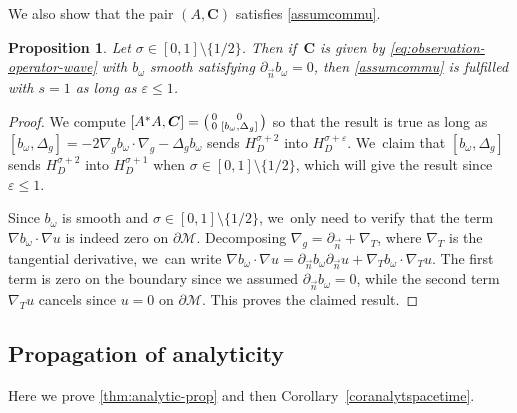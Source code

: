 \documentclass[JEP,XML,SOM,Unicode,published]{cedram}
\newtheorem{proposition}[theorem]{Proposition}
\theoremstyle{definition}
\let\mc\mathcal
\let\veps\varepsilon
\newcommand{\M}{\mc{M}}
\newcommand{\bC}{\boldsymbol{C}}
\begin{document}
We also show that the pair $(A, \bC)$ satisfies \cref{assumcommu}.
\begin{proposition}\label{propcommutwave}
Let $\sigma\in [0, 1]\setminus \{1/2\}$. Then if~$\bC$ is given by \eqref{eq:observation-operator-wave} with $b_{\omega}$ smooth satisfying $\partial_{\vec n}b_{\omega}=0$, then \cref{assumcommu} is fulfilled with $s=1$ as long as $\veps\leq 1$.
\end{proposition}
\begin{proof}
We compute $[A^*A,\bC]=\begin{psmallmatrix} 0 & 0 \\ 0 & [b_{\omega},\Delta_g]\end{psmallmatrix}$ so that the result is true as long as $[b_{\omega},\Delta_g]=-2\nabla_g b_{\omega}\cdot \nabla_g -\Delta_g b_{\omega}$ sends $H^{\sigma+2}_D$ into $H^{\sigma+\veps}_D$. We~claim that $[b_{\omega},\Delta_g]$ sends $H^{\sigma+2}_D$ into $H^{\sigma+1}_D$ when $\sigma\in [0, 1]\setminus \{1/2\}$, which will give the result since $\veps\leq 1$.

Since $b_{\omega}$ is smooth and $\sigma\in [0, 1]\setminus \{1/2\}$, we~only need to verify that the term $\nabla b_{\omega}\cdot \nabla u$ is indeed zero on $\partial\M$. Decomposing $\nabla_g =\partial_{\vec n}+\nabla_{T}$, where $\nabla_{T}$ is the tangential derivative, we~can write $\nabla b_{\omega}\cdot \nabla u=\partial_{\vec n}b_{\omega} \partial_{\vec n}u+\nabla_T b_{\omega}\cdot \nabla_T u$. The first term is zero on the boundary since we assumed $\partial_{\vec n}b_{\omega}=0$, while the second term $\nabla_T u$ cancels since $u=0$ on $\partial \M$. This proves the claimed result.
\end{proof}

\subsection{Propagation of analyticity}
Here we prove \cref{thm:analytic-prop} and then Corollary~\ref{coranalytspacetime}.
\end{document}
